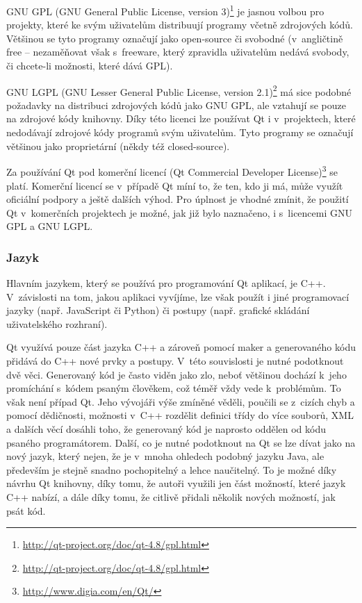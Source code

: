 \documentclass[a4paper,10pt]{article}
\begin{document}
GNU GPL (GNU General Public License, version 3)\footnote{\url{http://qt-project.org/doc/qt-4.8/gpl.html}} je jasnou volbou pro projekty, které ke svým uživatelům distribuují programy včetně zdrojových kódů.
Většinou se tyto programy označují jako open-source či svobodné (v~angličtině free -- nezaměňovat však s~freeware, který zpravidla uživatelům nedává svobody, či chcete-li možnosti, které dává GPL).

GNU LGPL (GNU Lesser General Public License, version 2.1)\footnote{\url{http://qt-project.org/doc/qt-4.8/gpl.html}} má sice podobné požadavky na distribuci zdrojových kódů jako GNU GPL, ale vztahují se pouze na zdrojové kódy knihovny.
Díky této licenci lze používat Qt i v~projektech, které nedodávají zdrojové kódy programů svým uživatelům.
Tyto programy se označují většinou jako proprietární (někdy též closed-source).

Za používání Qt pod komerční licencí (Qt Commercial Developer License)\footnote{\url{http://www.digia.com/en/Qt/}} se platí.
Komerční licencí se v~případě Qt míní to, že ten, kdo ji má, může využít oficiální podpory a ještě dalších výhod.
Pro úplnost je vhodné zmínit, že použití Qt v~komerčních projektech je možné, jak již bylo naznačeno, i s~licencemi GNU GPL a GNU LGPL.


\subsubsection{Jazyk}
Hlavním jazykem, který se používá pro programování Qt aplikací, je C++.
V~závislosti na tom, jakou aplikaci vyvíjíme, lze však použít i jiné programovací jazyky (např. JavaScript či Python) či postupy (např. grafické skládání uživatelského rozhraní).

Qt využívá pouze část jazyka C++ a zároveň pomocí maker a generovaného kódu přidává do C++ nové prvky a postupy.
V~této souvislosti je nutné podotknout dvě věci.
Generovaný kód je často viděn jako zlo, neboť většinou dochází k~jeho promíchání s~kódem psaným člověkem, což téměř vždy vede k~problémům.
To však není případ Qt.
Jeho vývojáři výše zmíněné věděli, poučili se z~cizích chyb a pomocí dědičnosti, možnosti v~C++ rozdělit definici třídy do více souborů, XML a dalších věcí dosáhli toho, že generovaný kód je naprosto oddělen od kódu psaného programátorem.
Další, co je nutné podotknout na Qt se lze dívat jako na nový jazyk, který nejen, že je v~mnoha ohledech podobný jazyku Java, ale především je stejně snadno pochopitelný a lehce naučitelný.
To je možné díky návrhu Qt knihovny, díky tomu, že autoři využili jen část možností, které jazyk C++ nabízí, a dále díky tomu, že citlivě přidali několik nových možností, jak psát kód.
\end{document}
